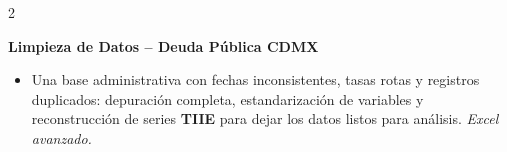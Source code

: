 \documentclass[10pt, letterpaper]{article}
\newenvironment{highlights}{
    \begin{itemize}[
        topsep=0.10 cm,
        parsep=0.10 cm,
        partopsep=0pt,
        itemsep=0pt,
        leftmargin=0.4 cm + 10pt
    ]
}{
    \end{itemize}
} %
\newenvironment{twocolentry}[2][]{
    \onecolentry
    \def\secondColumn{#2}
    \setcolumnwidth{\fill, 4.5 cm}
    \begin{paracol}{2}
}{
    \switchcolumn \raggedleft \secondColumn
    \end{paracol}
    \endonecolentry
} %
\let\hrefWithoutArrow\href
\renewcommand{\href}[2]{\hrefWithoutArrow{#1}{\ifthenelse{\equal{#2}{}}{ }{#2 }\raisebox{.15ex}{\footnotesize \faExternalLink*}}}
\begin{document}
\vspace{0.05 cm}

\begin{twocolentry}{
    \href{https://drive.google.com/file/d/1u2uN4X-W-sbW3lEXOigsWpWmMOgzthxX/view?usp=sharing}{PDF}
}
    \textbf{Limpieza de Datos -- Deuda Pública CDMX}
    \begin{highlights}
        \item Una base administrativa con fechas inconsistentes, tasas rotas y registros duplicados: depuración completa, estandarización de variables y reconstrucción de series \textbf{TIIE} para dejar los datos listos para análisis. \textit{Excel avanzado.}
    \end{highlights}
\end{twocolentry}
\end{document}
